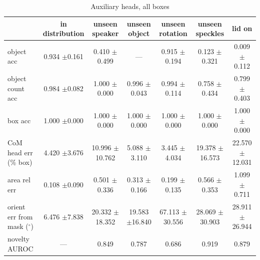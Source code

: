 \begin{table}
\caption{Auxiliary heads, all boxes}
\label{tab:aux_heads}
\begin{tabular}{l!{\vrule width 1.2pt}cccccc}
\toprule
 & in distribution & unseen speaker & unseen object & unseen rotation & unseen speckles & lid on \\
\midrule
object acc & 0.934 {\scriptsize $\pm$0.161} & 0.410 {\scriptsize $\pm$0.499} & — & 0.915 {\scriptsize $\pm$0.194} & 0.123 {\scriptsize $\pm$0.321} & 0.009 {\scriptsize $\pm$0.112} \\
object count acc & 0.984 {\scriptsize $\pm$0.082} & 1.000 {\scriptsize $\pm$0.000} & 0.996 {\scriptsize $\pm$0.043} & 0.994 {\scriptsize $\pm$0.114} & 0.758 {\scriptsize $\pm$0.434} & 0.799 {\scriptsize $\pm$0.403} \\
box acc & 1.000 {\scriptsize $\pm$0.000} & 1.000 {\scriptsize $\pm$0.000} & 1.000 {\scriptsize $\pm$0.000} & 1.000 {\scriptsize $\pm$0.000} & 1.000 {\scriptsize $\pm$0.000} & 1.000 {\scriptsize $\pm$0.000} \\
CoM head err (\% box) & 4.420 {\scriptsize $\pm$3.676} & 10.996 {\scriptsize $\pm$10.762} & 5.088 {\scriptsize $\pm$3.110} & 3.445 {\scriptsize $\pm$4.034} & 19.378 {\scriptsize $\pm$16.573} & 22.570 {\scriptsize $\pm$12.031} \\
area rel err & 0.108 {\scriptsize $\pm$0.090} & 0.501 {\scriptsize $\pm$0.336} & 0.313 {\scriptsize $\pm$0.166} & 0.199 {\scriptsize $\pm$0.135} & 0.566 {\scriptsize $\pm$0.353} & 1.099 {\scriptsize $\pm$0.711} \\
orient err from mask ($^\circ$) & 6.476 {\scriptsize $\pm$7.838} & 20.332 {\scriptsize $\pm$18.352} & 19.583 {\scriptsize $\pm$16.840} & 67.113 {\scriptsize $\pm$30.556} & 28.069 {\scriptsize $\pm$30.903} & 28.911 {\scriptsize $\pm$26.944} \\
novelty AUROC & — & 0.849 & 0.787 & 0.686 & 0.919 & 0.879 \\
\bottomrule
\end{tabular}
\end{table}
